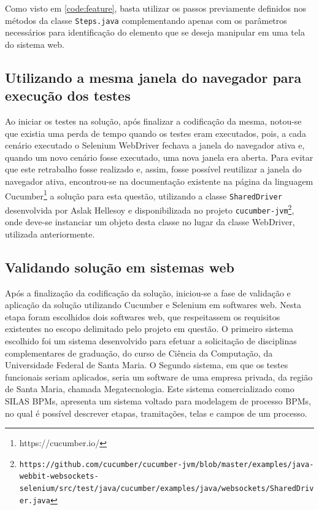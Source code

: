 \documentclass[tg]{mdtufsm}
\begin{document}
Como visto em \ref{code:feature}, basta utilizar os passos previamente definidos nos métodos da classe \texttt{Steps.java} complementando apenas com os parâmetros necessários para identificação do elemento que se deseja manipular em uma tela do sistema web.

\subsection{Utilizando a mesma janela do navegador para execução dos testes}
Ao iniciar os testes na solução, após finalizar a codificação da mesma, notou-se que existia uma perda de tempo quando os testes eram executados, pois, a cada cenário executado o Selenium WebDriver fechava a janela do navegador ativa e, quando um novo cenário fosse executado, uma nova janela era aberta. Para evitar que este retrabalho fosse realizado e, assim, fosse possível reutilizar a janela do navegador ativa, encontrou-se na documentação existente na página da linguagem Cucumber\footnote{https://cucumber.io/} a solução para esta questão, utilizando a classe \texttt{SharedDriver} desenvolvida por Aslak Hellesoy e disponibilizada no projeto \texttt{cucumber-jvm\footnote{https://github.com/cucumber/cucumber-jvm/blob/master/examples/java-webbit-websockets-selenium/src/test/java/cucumber/examples/java/websockets/SharedDriver.java}}, onde deve-se instanciar um objeto desta classe no lugar da classe WebDriver, utilizada anteriormente.

\subsection{Validando solução em sistemas web}
Após a finalização da codificação da solução, iniciou-se a fase de validação e aplicação da solução utilizando Cucumber e Selenium em softwares web. Nesta etapa foram escolhidos dois softwares web, que respeitassem os requisitos existentes no escopo delimitado pelo projeto em questão. O primeiro sistema escolhido foi um sistema desenvolvido para efetuar a solicitação de disciplinas complementares de graduação, do curso de Ciência da Computação, da Universidade Federal de Santa Maria. O Segundo sistema, em que os testes funcionais seriam aplicados, seria um software de uma empresa privada, da região de Santa Maria, chamada Megatecnologia. Este sistema comercializado como SILAS BPMs, apresenta
um sistema voltado para modelagem de processo BPMs, no qual é possível descrever etapas, tramitações, telas e campos de um processo.
\end{document}
